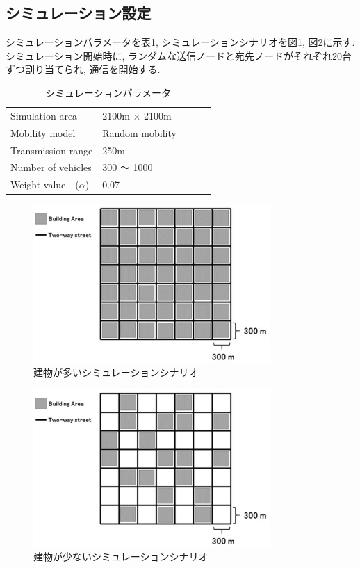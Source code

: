 \documentclass[technicalreport]{ieicej}
\begin{document}
\subsection{シミュレーション設定}
シミュレーションパラメータを表\ref{tab:parameter}, シミュレーションシナリオを図\ref{fig:big-scenario}, 図\ref{fig:small-scenario}に示す. シミュレーション開始時に, ランダムな送信ノードと宛先ノードがそれぞれ20台ずつ割り当てられ, 通信を開始する. 
\begin{table}[!ht]
\begin{center}
\caption{シミュレーションパラメータ}
\label{tab:parameter}
\begin{tabular}{|l|l|lll}
\cline{1-2}
Simulation area    & 2100m × 2100m   &  &  &  \\ \cline{1-2}
Mobility model     & Random mobility &  &  &  \\ \cline{1-2}
Transmission range & 250m            &  &  &  \\ \cline{1-2}
Number of vehicles & 300 ～ 1000      &  &  &  \\ \cline{1-2}
Weight value　($α$) & 0.07      &  &  &  \\ \cline{1-2}
\end{tabular}
\end{center}
\end{table}

\begin{figure}[!ht]
\centering
\includegraphics[width=90mm]{figures/big-scenario.eps}
\caption{建物が多いシミュレーションシナリオ}
\label{fig:big-scenario}
\end{figure}

\begin{figure}[!ht]
\centering
\includegraphics[width=90mm]{figures/small-scenario.eps}
\caption{建物が少ないシミュレーションシナリオ}
\label{fig:small-scenario}
\end{figure}
\end{document}
